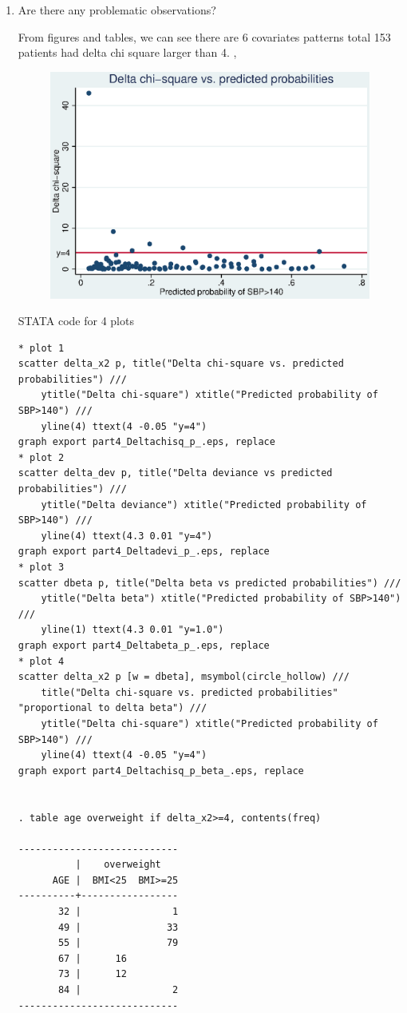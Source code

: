 \documentclass{article}
\begin{document}
  \begin{enumerate}
    \item Are there any problematic observations?
    
    From figures and tables, we can see there are 6 covariates patterns total 153 patients had delta chi square larger than 4. , 
    
    \begin{figure}
    \centering
    \includegraphics[width=.8\linewidth]{04/part4_Deltachisq_p_.eps}
    \end{figure}

      STATA code for 4 plots
      \begin{verbatim}
* plot 1
scatter delta_x2 p, title("Delta chi-square vs. predicted probabilities") ///
	ytitle("Delta chi-square") xtitle("Predicted probability of SBP>140") ///
	yline(4) ttext(4 -0.05 "y=4")
graph export part4_Deltachisq_p_.eps, replace
* plot 2
scatter delta_dev p, title("Delta deviance vs predicted probabilities") ///
	ytitle("Delta deviance") xtitle("Predicted probability of SBP>140") ///
	yline(4) ttext(4.3 0.01 "y=4")
graph export part4_Deltadevi_p_.eps, replace
* plot 3 
scatter dbeta p, title("Delta beta vs predicted probabilities") ///
	ytitle("Delta beta") xtitle("Predicted probability of SBP>140") ///
	yline(1) ttext(4.3 0.01 "y=1.0")
graph export part4_Deltabeta_p_.eps, replace
* plot 4
scatter delta_x2 p [w = dbeta], msymbol(circle_hollow) ///
	title("Delta chi-square vs. predicted probabilities" "proportional to delta beta") ///
	ytitle("Delta chi-square") xtitle("Predicted probability of SBP>140") ///
	yline(4) ttext(4 -0.05 "y=4")
graph export part4_Deltachisq_p_beta_.eps, replace


. table age overweight if delta_x2>=4, contents(freq)

----------------------------
          |    overweight   
      AGE |  BMI<25  BMI>=25
----------+-----------------
       32 |                1
       49 |               33
       55 |               79
       67 |      16         
       73 |      12         
       84 |                2
----------------------------


\end{verbatim}
\end{enumerate}
\end{document}
